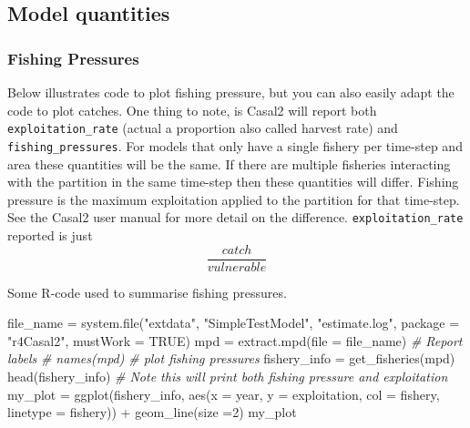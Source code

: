 \documentclass[
]{book}
\newenvironment{Shaded}{\begin{snugshade}}{\end{snugshade}}
\newcommand{\AttributeTok}[1]{\textcolor[rgb]{0.77,0.63,0.00}{#1}}
\newcommand{\CommentTok}[1]{\textcolor[rgb]{0.56,0.35,0.01}{\textit{#1}}}
\newcommand{\ConstantTok}[1]{\textcolor[rgb]{0.00,0.00,0.00}{#1}}
\newcommand{\DecValTok}[1]{\textcolor[rgb]{0.00,0.00,0.81}{#1}}
\newcommand{\FunctionTok}[1]{\textcolor[rgb]{0.00,0.00,0.00}{#1}}
\newcommand{\NormalTok}[1]{#1}
\newcommand{\OtherTok}[1]{\textcolor[rgb]{0.56,0.35,0.01}{#1}}
\newcommand{\SpecialCharTok}[1]{\textcolor[rgb]{0.00,0.00,0.00}{#1}}
\newcommand{\StringTok}[1]{\textcolor[rgb]{0.31,0.60,0.02}{#1}}
\begin{document}
\hypertarget{model-quantities}{%
\subsection{Model quantities}\label{model-quantities}}

\hypertarget{fishing-pressures}{%
\subsubsection*{Fishing Pressures}\label{fishing-pressures}}

Below illustrates code to plot fishing pressure, but you can also easily adapt the code to plot catches. One thing to note, is Casal2 will report both \texttt{exploitation\_rate} (actual a proportion also called harvest rate) and \texttt{fishing\_pressures}. For models that only have a single fishery per time-step and area these quantities will be the same. If there are multiple fisheries interacting with the partition in the same time-step then these quantities will differ. Fishing pressure is the maximum exploitation applied to the partition for that time-step. See the Casal2 user manual for more detail on the difference. \texttt{exploitation\_rate} reported is just
\[
\frac{catch}{vulnerable}
\]

Some R-code used to summarise fishing pressures.

\begin{Shaded}
\begin{Highlighting}[]
\NormalTok{file\_name }\OtherTok{=} \FunctionTok{system.file}\NormalTok{(}\StringTok{"extdata"}\NormalTok{, }\StringTok{"SimpleTestModel"}\NormalTok{, }\StringTok{"estimate.log"}\NormalTok{, }
                        \AttributeTok{package =} \StringTok{"r4Casal2"}\NormalTok{, }\AttributeTok{mustWork =} \ConstantTok{TRUE}\NormalTok{)}
\NormalTok{mpd }\OtherTok{=} \FunctionTok{extract.mpd}\NormalTok{(}\AttributeTok{file =}\NormalTok{ file\_name)}
\CommentTok{\# Report labels}
\CommentTok{\# names(mpd) }
\CommentTok{\# plot fishing pressures}
\NormalTok{fishery\_info }\OtherTok{=} \FunctionTok{get\_fisheries}\NormalTok{(mpd)}
\FunctionTok{head}\NormalTok{(fishery\_info)}
\CommentTok{\# Note this will print both fishing pressure and exploitation}
\NormalTok{my\_plot }\OtherTok{=} \FunctionTok{ggplot}\NormalTok{(fishery\_info, }\FunctionTok{aes}\NormalTok{(}\AttributeTok{x =}\NormalTok{ year, }\AttributeTok{y =}\NormalTok{ exploitation, }\AttributeTok{col =}\NormalTok{ fishery, }\AttributeTok{linetype =}\NormalTok{ fishery)) }\SpecialCharTok{+}
                   \FunctionTok{geom\_line}\NormalTok{(}\AttributeTok{size =}\DecValTok{2}\NormalTok{)}
\NormalTok{my\_plot}
\end{Highlighting}
\end{Shaded}
\end{document}
